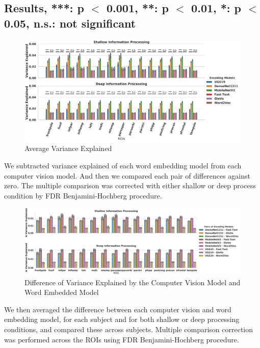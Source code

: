 \documentclass{sciposter}
\begin{document}
\begin{multicols}{3}
\section{Results, ***: p $<$ 0.001, **: p $<$ 0.01, *: p $<$ 0.05, n.s.: not significant}
\begin{figure}
    \centering
    \includegraphics[width=1.07\linewidth]{fig5.png}
    \caption{Average Variance Explained}
    \label{fig3}
\end{figure}

\large
We subtracted variance explained of each word embedding model from each computer vision model. And then we compared each pair of differences against zero. The multiple comparison was corrected with either shallow or deep process condition by FDR Benjamini-Hochberg procedure. 

\begin{figure}
    \centering
    \includegraphics[width=1.07\linewidth]{fig6.png}
    \caption{Difference of Variance Explained by the Computer Vision Model and Word Embedded Model}
    \label{fig4}
\end{figure}


\large
We then averaged the difference between each computer vision and word embedding model, for each subject and for both shallow or deep processing conditions, and compared these across subjects. Multiple comparison correction was performed across the ROIs using FDR Benjamini-Hochberg procedure. 


\end{multicols}
\end{document}
